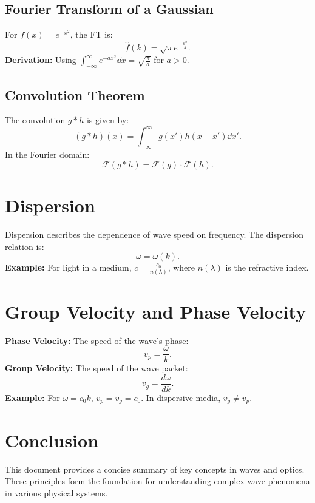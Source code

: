 \documentclass[a4paper, 12pt]{article}
\begin{document}
\subsection{Fourier Transform of a Gaussian}
For $f(x) = e^{-x^2}$, the FT is:
\[ \hat{f}(k) = \sqrt{\pi} e^{-\frac{k^2}{4}}. \]
\textbf{Derivation:} Using $\int_{-\infty}^{\infty} e^{-ax^2} \dd{x} = \sqrt{\frac{\pi}{a}}$ for $a > 0$.
\subsection{Convolution Theorem}
The convolution $g*h$ is given by:
\[ (g*h)(x) = \int_{-\infty}^{\infty} g(x')h(x-x') \dd{x'}. \]
In the Fourier domain:
\[ \mathcal{F}(g*h) = \mathcal{F}(g) \cdot \mathcal{F}(h). \]

\section{Dispersion}
Dispersion describes the dependence of wave speed on frequency. The dispersion relation is:
\[ \omega = \omega(k). \]
\textbf{Example:} For light in a medium, $c = \frac{c_0}{n(\lambda)}$, where $n(\lambda)$ is the refractive index.

\section{Group Velocity and Phase Velocity}
\textbf{Phase Velocity:} The speed of the wave's phase:
\[ v_p = \frac{\omega}{k}. \]
\textbf{Group Velocity:} The speed of the wave packet:
\[ v_g = \frac{d\omega}{dk}. \]
\textbf{Example:} For $\omega = c_0 k$, $v_p = v_g = c_0$. In dispersive media, $v_g \neq v_p$.

\section*{Conclusion}
This document provides a concise summary of key concepts in waves and optics. These principles form the foundation for understanding complex wave phenomena in various physical systems.
\end{document}
